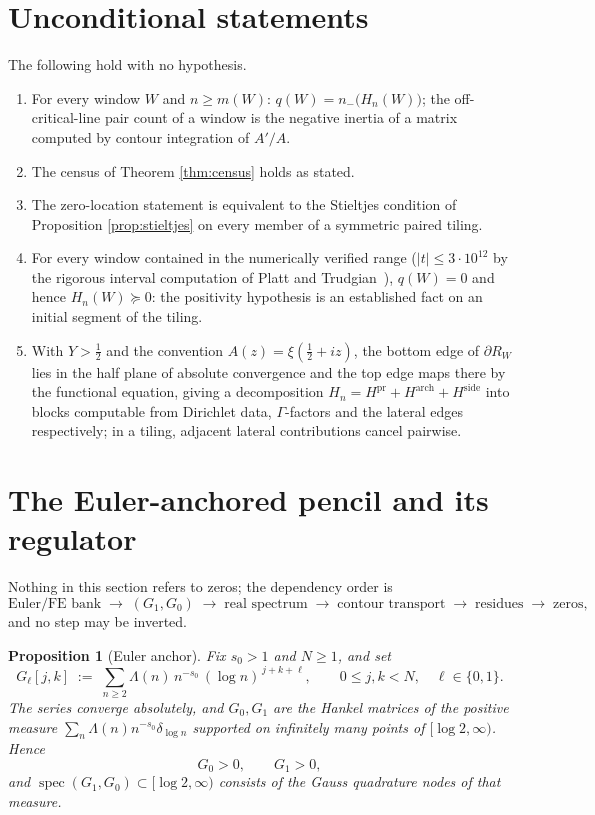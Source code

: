 \documentclass[11pt]{article}
\theoremstyle{plain}
\newtheorem{proposition}[theorem]{Proposition}
\theoremstyle{definition}
\theoremstyle{remark}
\newcommand{\Lam}{\Lambda}
\DeclareMathOperator{\spec}{spec}
\begin{document}
\section{Unconditional statements}

The following hold with no hypothesis.

\begin{enumerate}
\item[(U1)] For every window $W$ and $n\ge m(W)$: $q(W)=n_-\bigl(H_n(W)\bigr)$; the
off-critical-line pair count of a window is the negative inertia of a matrix computed by
contour integration of $A'/A$.
\item[(U2)] The census of Theorem \ref{thm:census} holds as stated.
\item[(U3)] The zero-location statement is equivalent to the Stieltjes condition of
Proposition \ref{prop:stieltjes} on every member of a symmetric paired tiling.
\item[(U4)] For every window contained in the numerically verified range
($|t|\le 3\cdot 10^{12}$ by the rigorous interval computation of Platt and
Trudgian~\cite{PlattTrudgian2021}), $q(W)=0$ and hence
$H_n(W)\succeq 0$: the positivity hypothesis is an established fact on an initial
segment of the tiling.
\item[(U5)] With $Y>\tfrac12$ and the convention
$A(z)=\xi(\tfrac12+iz)$, the bottom edge of $\partial R_W$ lies in the half plane of
absolute convergence and the top edge maps there by the functional equation, giving a
decomposition $H_n = H^{\mathrm{pr}} + H^{\mathrm{arch}} + H^{\mathrm{side}}$ into blocks
computable from Dirichlet data, $\Gamma$-factors and the lateral edges respectively; in a
tiling, adjacent lateral contributions cancel pairwise.
\end{enumerate}

\section{The Euler-anchored pencil and its regulator}

Nothing in this section refers to zeros; the dependency order is
\[
  \text{Euler/FE bank}\;\to\;(G_1,G_0)\;\to\;\text{real spectrum}\;\to\;
  \text{contour transport}\;\to\;\text{residues}\;\to\;\text{zeros},
\]
and no step may be inverted.

\begin{proposition}[Euler anchor]\label{prop:anchor}
Fix $s_0>1$ and $N\ge1$, and set
\[
  G_\ell[j,k] \;:=\; \sum_{n\ge2} \Lam(n)\,n^{-s_0}\,(\log n)^{\,j+k+\ell},
  \qquad 0\le j,k<N,\quad \ell\in\{0,1\}.
\]
The series converge absolutely, and $G_0,G_1$ are the Hankel matrices of the positive
measure $\sum_n \Lam(n)n^{-s_0}\delta_{\log n}$ supported on infinitely many points of
$[\log 2,\infty)$. Hence
\[
  G_0 > 0,\qquad G_1 > 0,
\]
and $\spec(G_1,G_0)\subset[\log2,\infty)$ consists of the Gauss quadrature nodes of that
measure.
\end{proposition}
\end{document}
